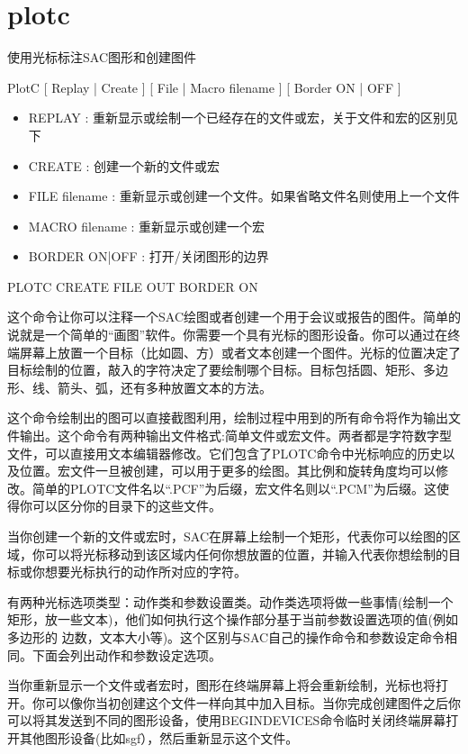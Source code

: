 \section{plotc}
\label{cmd:plotc}

使用光标标注SAC图形和创建图件

PlotC [ Replay | Create ] [ File | Macro filename ] [ Border ON | OFF ] 

\begin{itemize}
\item REPLAY : 重新显示或绘制一个已经存在的文件或宏，关于文件和宏的区别见下 
\item CREATE : 创建一个新的文件或宏 
\item FILE filename : 重新显示或创建一个文件。如果省略文件名则使用上一个文件
\item MACRO filename : 重新显示或创建一个宏 
\item BORDER ON|OFF : 打开/关闭图形的边界 
\end{itemize}

PLOTC CREATE FILE OUT BORDER ON

这个命令让你可以注释一个SAC绘图或者创建一个用于会议或报告的图件。简单的说就是一个简单的``画图''软件。你需要一个具有光标的图形设备。你可以通过在终端屏幕上放置一个目标（比如圆、方）或者文本创建一个图件。光标的位置决定了目标绘制的位置，敲入的字符决定了要绘制哪个目标。目标包括圆、矩形、多边形、线、箭头、弧，还有多种放置文本的方法。

这个命令绘制出的图可以直接截图利用，绘制过程中用到的所有命令将作为输出文件输出。这个命令有两种输出文件格式:简单文件或宏文件。两者都是字符数字型文件，可以直接用文本编辑器修改。它们包含了PLOTC命令中光标响应的历史以及位置。宏文件一旦被创建，可以用于更多的绘图。其比例和旋转角度均可以修改。简单的PLOTC文件名以``.PCF''为后缀，宏文件名则以``.PCM''为后缀。这使得你可以区分你的目录下的这些文件。

当你创建一个新的文件或宏时，SAC在屏幕上绘制一个矩形，代表你可以绘图的区域，你可以将光标移动到该区域内任何你想放置的位置，并输入代表你想绘制的目标或你想要光标执行的动作所对应的字符。

有两种光标选项类型：动作类和参数设置类。动作类选项将做一些事情(绘制一个矩形，放一些文本)，他们如何执行这个操作部分基于当前参数设置选项的值(例如多边形的	边数，文本大小等)。这个区别与SAC自己的操作命令和参数设定命令相同。下面会列出动作和参数设定选项。

当你重新显示一个文件或者宏时，图形在终端屏幕上将会重新绘制，光标也将打开。你可以像你当初创建这个文件一样向其中加入目标。当你完成创建图件之后你可以将其发送到不同的图形设备，使用BEGINDEVICES命令临时关闭终端屏幕打开其他图形设备(比如sgf），然后重新显示这个文件。

